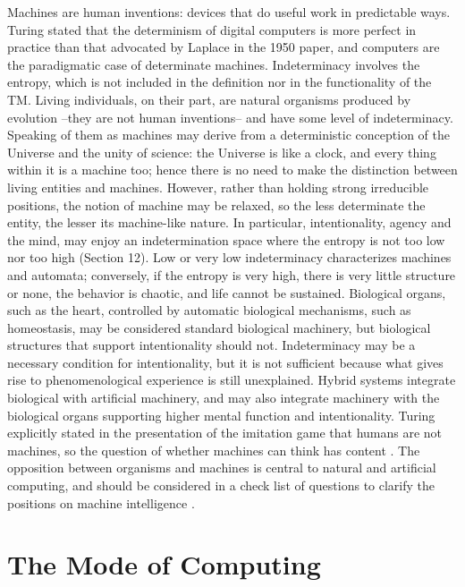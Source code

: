 \documentclass[11pt]{article}
\begin{document}
Machines are human inventions: devices that do useful work in predictable ways. Turing stated that the determinism of digital computers is more perfect in practice than that advocated by Laplace in the 1950 paper, and computers are the paradigmatic case of determinate machines. Indeterminacy involves the entropy, which is not included in the definition nor in the functionality of the TM. Living individuals, on their part, are natural organisms produced by evolution --they are not human inventions-- and have some level of indeterminacy. Speaking of them as machines may derive from a deterministic conception of the Universe and the unity of science: the Universe is like a clock, and every thing within it is a machine too; hence there is no need to make the distinction between living entities and machines. However, rather than holding strong irreducible positions, the notion of machine may be relaxed, so the less determinate the entity, the lesser its machine-like nature. In particular, intentionality, agency and the mind, may enjoy an indetermination space where the entropy is not too low nor too high \cite{Pineda-2024} (Section 12). Low or very low indeterminacy characterizes machines and automata; conversely, if the entropy is very high, there is very little structure or none, the behavior is chaotic, and life cannot be sustained. Biological organs, such as the heart, controlled by automatic biological mechanisms, such as homeostasis, may be considered standard biological machinery, but biological structures that support intentionality should not. Indeterminacy may be a necessary condition for intentionality, but it is not sufficient because what gives rise to phenomenological experience is still unexplained. Hybrid systems integrate biological with artificial machinery, and may also integrate machinery with the biological organs supporting higher mental function and intentionality. Turing explicitly stated in the presentation of the imitation game that humans are not machines, so the question of whether machines can think has content \cite{turing-1950}. The opposition between organisms and machines is central to natural and artificial computing, and should be considered in a check list of questions to clarify the positions on machine intelligence \cite{Rouleau-2024}.

\section{The Mode of Computing}
\label{sec:mode-comp}
\end{document}
